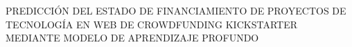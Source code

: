 \begin{center}
	\vspace*{10cm}
	{PREDICCIÓN DEL ESTADO DE FINANCIAMIENTO DE PROYECTOS DE TECNOLOGÍA EN WEB DE CROWDFUNDING KICKSTARTER MEDIANTE MODELO DE APRENDIZAJE PROFUNDO}
\end{center}
